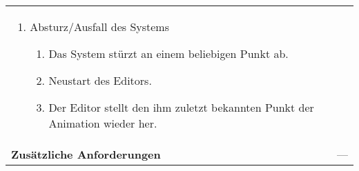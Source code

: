 \begin{longtabu}{p{0.5\textwidth}p{0.5\textwidth}}
\begin{enumerate}[label= (\alph*)]
{\begin{enumerate}[label= (\roman*)]
{                            Echtzeit-Animation ist nicht gewährleistet.}
                \end{enumerate}
            }
            \item{Absturz/Ausfall des Systems
                \begin{enumerate}[label= (\roman*)]
                        \item{Das System stürzt an einem beliebigen Punkt
                                ab.}
                        \item{Neustart des Editors.}
                        \item{Der Editor stellt den ihm zuletzt bekannten
                                Punkt der Animation wieder her.}
                \end{enumerate}
            }
        \end{enumerate}
        \\
    \cmidrule(r){1-1}\cmidrule(lr){2-2}
        \textbf{Zusätzliche Anforderungen} &
        ---\\
    \bottomrule
\end{longtabu}

